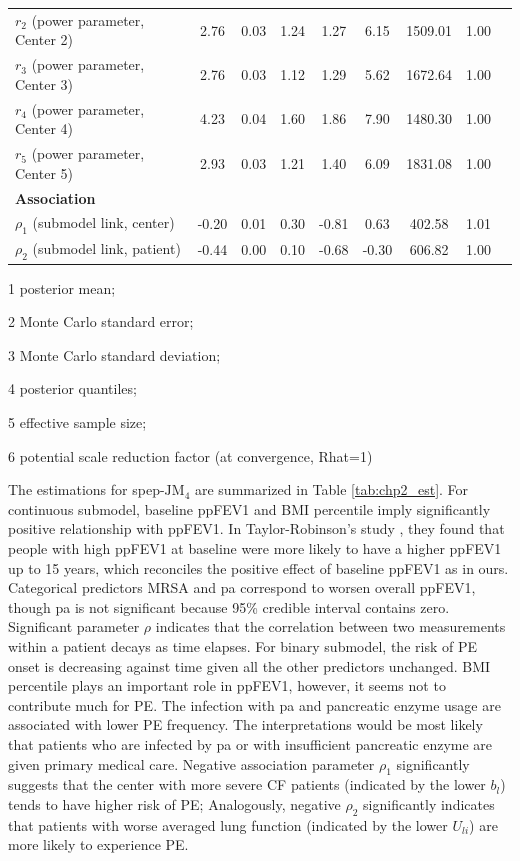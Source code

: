 \begin{center}
\begin{table}[ht]
\begin{threeparttable}
\begin{tabular}{lcccccccc}
    $r_2$ (power parameter, Center 2) & 2.76&0.03&1.24&1.27&6.15&1509.01&1.00\\
    $r_3$ (power parameter, Center 3)& 2.76&0.03&1.12&1.29&5.62&1672.64&1.00\\
    $r_4$ (power parameter, Center 4)& 4.23&0.04&1.60&1.86&7.90&1480.30&1.00\\
    $r_5$ (power parameter, Center 5)& 2.93&0.03&1.21&1.40&6.09&1831.08&1.00\\
  \midrule
 \textbf{Association} &&&&&&& \\
  \midrule
    $\rho_1$ (submodel link, center) & -0.20&0.01&0.30&-0.81&0.63&402.58&1.01\\
    $\rho_2$ (submodel link, patient) & -0.44&0.00&0.10&-0.68&-0.30&606.82&1.00\\
    \bottomrule
  \end{tabular}
 \begin{tablenotes}[para]
    \footnotesize
    \item[1] posterior mean; \item[2] Monte Carlo standard error; \item[3] Monte Carlo standard deviation; \item[4] posterior quantiles; \item[5] effective sample size; \item[6] potential scale reduction factor (at convergence, Rhat=1)
    \end{tablenotes}
    \end{threeparttable}
\end {table}
\end{center}

The estimations for spep-$\mbox{JM}_4$ are summarized in Table \ref{tab:chp2_est}. For continuous submodel, baseline ppFEV1 and BMI percentile imply significantly positive relationship with ppFEV1. In Taylor-Robinson's study \cite{TaylorRobinson2012}, they found that people with high ppFEV1 at baseline were more likely to have a higher ppFEV1 up to 15 years, which reconciles the positive effect of baseline ppFEV1 as in ours. Categorical predictors MRSA and pa correspond to worsen overall ppFEV1, though pa is not significant because 95\% credible interval contains zero. Significant parameter $\rho$ indicates that the correlation between two measurements within a patient decays as time elapses. For binary submodel, the risk of PE onset is decreasing against time given all the other predictors unchanged. BMI percentile plays an important role in ppFEV1, however, it seems not to contribute much for PE. The infection with pa and pancreatic enzyme usage are associated with lower PE frequency. The interpretations would be most likely that patients who are infected by pa or with insufficient pancreatic enzyme are given primary medical care. Negative association parameter $\rho_1$ significantly suggests that the center with more severe CF patients (indicated by the lower $b_l$) tends to have higher risk of PE; Analogously, negative $\rho_2$ significantly indicates that patients with worse averaged lung function (indicated by the lower $U_{li}$) are more likely to experience PE.

